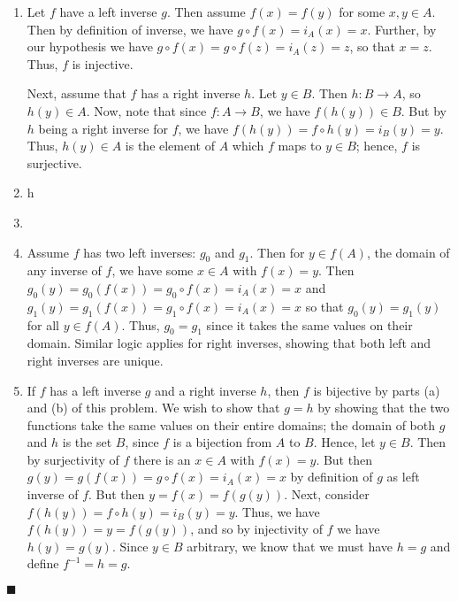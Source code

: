 \documentclass[12pt]{article}
\renewcommand{\qed}{\hfill$\blacksquare$}
\renewenvironment{proof}{\begin{addmargin}[1em]{0em}\begin{newproof}}{\end{newproof}\end{addmargin}\qed}
\begin{document}
\begin{proof}
\begin{enumerate}[label=(\alph*)]
	\item Let $f$ have a left inverse $g$. Then assume $f\left(x\right) = f\left(y\right)$ for some $x,y \in A$. Then by definition of inverse, we have $ g\circ f\left(x\right) = i_A\left(x\right) = x$. Further, by our hypothesis we have $g\circ f\left(x\right) = g\circ f\left(z\right) = i_A\left(z\right) = z$, so that $x = z$. Thus, $f$ is injective.
	
	Next, assume that $f$ has a right inverse $h$. Let $y \in B$. Then $h:B\rightarrow A$, so $h\left(y\right) \in A$. Now, note that since $f:A\rightarrow B$, we have $f\left(h\left(y\right)\right) \in B$. But by $h$ being a right inverse for $f$, we have $f\left(h\left(y\right)\right) = f\circ h \left(y\right) = i_B\left(y\right) = y$. Thus, $h\left(y\right)\in A$ is the element of $A$ which $f$ maps to $y \in B$; hence, $f$ is surjective.
	
	\item h
	
	\item
	
	\item Assume $f$ has two left inverses: $g_0$ and $g_1$. Then for $y \in f\left(A\right)$, the domain of any inverse of $f$, we have some $x\in A$ with $f\left(x\right) =y$. Then $g_0\left(y\right) = g_0\left(f\left(x\right)\right) = g_0 \circ f \left(x\right) = i_A\left(x\right)=x$ and $g_1\left(y\right) = g_1\left(f\left(x\right)\right) = g_1 \circ f\left(x\right) = i_A\left(x\right)=x$ so that $g_0\left(y\right) = g_1\left(y\right)$ for all $y \in f\left(A\right)$. Thus, $g_0 = g_1$ since it takes the same values on their domain. 
	Similar logic applies for right inverses, showing that both left and right inverses are unique.
	
	\item If $f$ has a left inverse $g$ and a right inverse $h$, then $f$ is bijective by parts (a) and (b) of this problem. We wish to show that $g = h$ by showing that the two functions take the same values on their entire domains; the domain of both $g$ and $h$ is the set $B$, since $f$ is a bijection from $A$ to $B$. Hence, let $y \in B$. Then by surjectivity of $f$ there is an $x \in A$ with $f\left(x\right) = y$. But then $g\left(y\right) = g\left(f\left(x\right)\right) = g\circ f \left(x\right) = i_A\left(x\right) = x$ by definition of $g$ as left inverse of $f$. But then $y = f\left(x\right) = f\left(g\left(y\right)\right)$. Next, consider $f\left(h\left(y\right)\right) = f\circ h \left(y\right) = i_B\left(y\right) = y$.  Thus, we have $f\left(h\left(y\right)\right) = y = f\left(g\left(y\right)\right)$, and so by injectivity of $f$ we have $h\left(y\right) = g\left(y\right)$. Since $y \in B$ arbitrary, we know that we must have $h = g$ and define $f^{-1} = h = g$.
\end{enumerate}
\end{proof}
\end{document}
